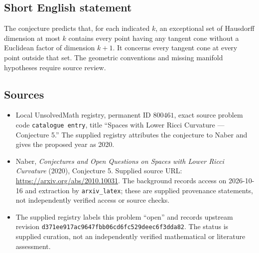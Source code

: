 \documentclass[11pt]{article}
\begin{document}
\subsection{Short English statement}
The conjecture predicts that, for each indicated \(k\), an exceptional set of Hausdorff dimension at most \(k\) contains every point having any tangent cone without a Euclidean factor of dimension \(k+1\). It concerns every tangent cone at every point outside that set. The geometric conventions and missing manifold hypotheses require source review.
\subsection{Sources}
\begin{itemize}
\item Local UnsolvedMath registry, permanent ID \(800461\), exact source problem code \texttt{catalogue entry}, title ``Spaces with Lower Ricci Curvature --- Conjecture 5.'' The supplied registry attributes the conjecture to Naber and gives the proposed year as 2020.
\item Naber, \emph{Conjectures and Open Questions on Spaces with Lower Ricci Curvature} (2020), Conjecture 5. Supplied source URL: \url{https://arxiv.org/abs/2010.10031}. The background records access on 2026-10-16 and extraction by \texttt{arxiv\_latex}; these are supplied provenance statements, not independently verified access or source checks.
\item The supplied registry labels this problem ``open'' and records upstream revision \texttt{d371ee917ac9647fbb06cd6fc529deec6f3dda82}. The status is supplied curation, not an independently verified mathematical or literature assessment.
\end{itemize}
\end{document}
